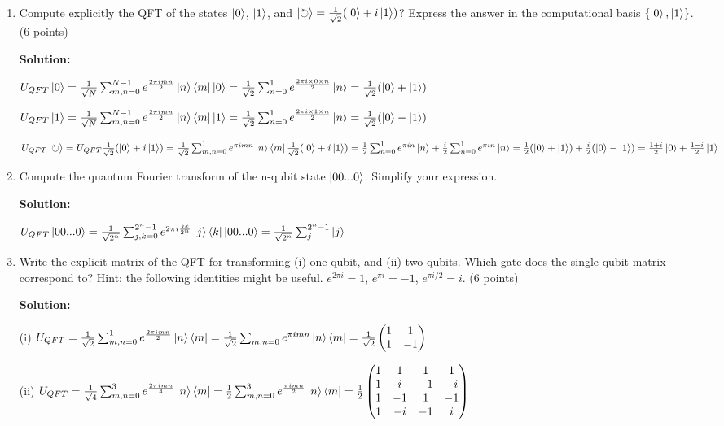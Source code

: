 \documentclass[12pt]{article}
\begin{document}
\begin{enumerate}
    \item Compute explicitly the QFT of the states $\ket{0}$, $\ket{1}$, and $\ket{\circlearrowright} = \frac{1}{\sqrt{2}}(\ket{0}+i\ket{1})$? Express the answer in the computational basis $\{\ket{0}, \ket{1}\}$. (6 points)

          \textbf{Solution:}

          $U_{QFT}\ket{0} = \frac{1}{\sqrt{N}}\sum_{m,n=0}^{N-1}e^{\frac{2\pi imn}{2}}\ket{n}\bra{m}\ket{0}=\frac{1}{\sqrt{2}}\sum_{n=0}^{1}e^{\frac{2\pi i\times0\times n}{2}}\ket{n}=\frac{1}{\sqrt{2}}(\ket{0}+\ket{1})$

          $U_{QFT}\ket{1} = \frac{1}{\sqrt{N}}\sum_{m,n=0}^{N-1}e^{\frac{2\pi imn}{2}}\ket{n}\bra{m}\ket{1}=\frac{1}{\sqrt{2}}\sum_{n=0}^{1}e^{\frac{2\pi i\times1\times n}{2}}\ket{n}=\frac{1}{\sqrt{2}}(\ket{0}-\ket{1})$

          $U_{QFT}\ket{\circlearrowright} = U_{QFT}\frac{1}{\sqrt{2}}(\ket{0}+i\ket{1})=\frac{1}{\sqrt{2}}\sum_{m,n=0}^{1}e^{\pi imn}\ket{n}\bra{m}\frac{1}{\sqrt{2}}(\ket{0}+i\ket{1})=\frac{1}{2}\sum_{n=0}^{1}e^{\pi in}\ket{n}+\frac{i}{2}\sum_{n=0}^{1}e^{\pi in}\ket{n}=\frac{1}{2}(\ket{0}+\ket{1})+\frac{i}{2}(\ket{0}-\ket{1})=\frac{1+i}{2}\ket{0}+\frac{1-i}{2}\ket{1}$

    \item Compute the quantum Fourier transform of the n-qubit state $\ket{00...0}$. Simplify your expression.

          \textbf{Solution:}

          $U_{QFT}\ket{00...0} = \frac{1}{\sqrt{2^n}}\sum_{j,k=0}^{2^n-1}e^{2\pi i\frac{jk}{2^n}}\ket{j}\bra{k}\ket{00...0}=\frac{1}{\sqrt{2^n}}\sum_j^{2^n-1}\ket{j}$

    \item Write the explicit matrix of the QFT for transforming (i) one qubit, and (ii) two qubits. Which gate does the single-qubit matrix correspond to? Hint: the following identities might be useful. $e^{2\pi i} = 1$, $e^{\pi i} = -1$, $e^{\pi i/2} = i$. (6 points)

          \textbf{Solution:}

          (i) $U_{QFT} = \frac{1}{\sqrt{2}}\sum_{m,n=0}^{1}e^{\frac{2\pi imn}{2}}\ket{n}\bra{m}=\frac{1}{\sqrt{2}}\sum_{m,n=0}e^{\pi imn}\ket{n}\bra{m}=\frac{1}{\sqrt{2}}\begin{pmatrix}
                  1 & 1  \\
                  1 & -1
              \end{pmatrix}$

          (ii) $U_{QFT} = \frac{1}{\sqrt{4}}\sum_{m,n=0}^{3}e^{\frac{2\pi imn}{4}}\ket{n}\bra{m}=\frac{1}{2}\sum_{m,n=0}^{3}e^{\frac{\pi imn}{2}}\ket{n}\bra{m}=\frac{1}{2}\begin{pmatrix}
                  1 & 1  & 1  & 1  \\
                  1 & i  & -1 & -i \\
                  1 & -1 & 1  & -1 \\
                  1 & -i & -1 & i
              \end{pmatrix}$
\end{enumerate}
\end{document}
